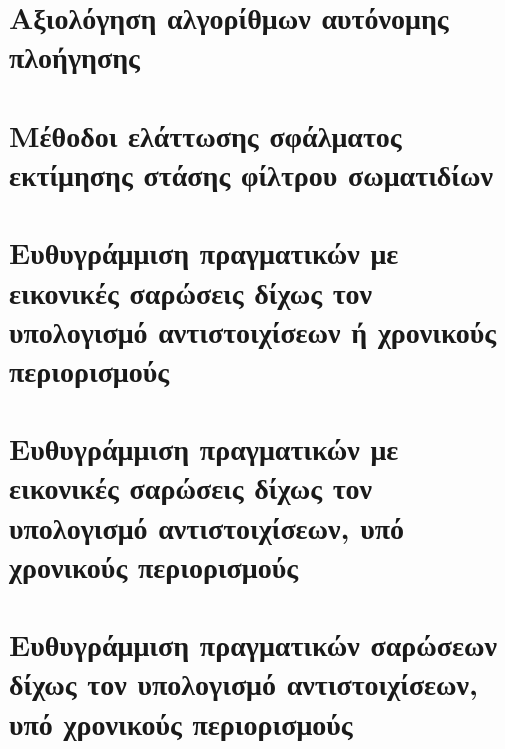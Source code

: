 \chapter{Αξιολόγηση αλγορίθμων αυτόνομης πλοήγησης}
  \label{part:02:chapter:01}
  




\chapter{Μέθοδοι ελάττωσης σφάλματος εκτίμησης στάσης φίλτρου σωματιδίων}
  \label{part:02:chapter:02}
  

\chapter{Ευθυγράμμιση πραγματικών με εικονικές σαρώσεις δίχως τον υπολογισμό αντιστοιχίσεων ή χρονικούς περιορισμούς}
  \label{part:02:chapter:03}
  

\chapter{Ευθυγράμμιση πραγματικών με εικονικές σαρώσεις δίχως τον υπολογισμό αντιστοιχίσεων, υπό χρονικούς περιορισμούς}
  \label{part:02:chapter:04}
  

\chapter{Ευθυγράμμιση πραγματικών σαρώσεων δίχως τον υπολογισμό αντιστοιχίσεων, υπό χρονικούς περιορισμούς}
  \label{part:02:chapter:05}
  
